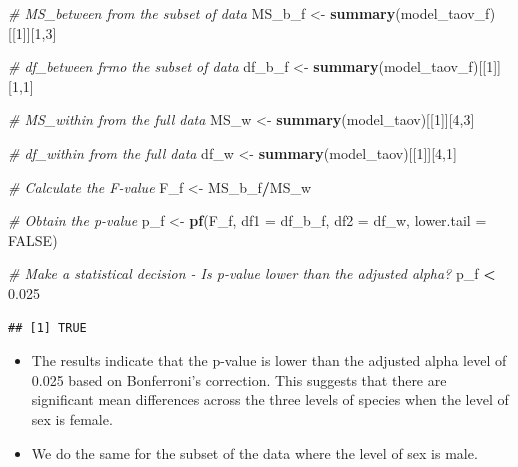 \documentclass[
]{book}
\newenvironment{Shaded}{\begin{snugshade}}{\end{snugshade}}
\newcommand{\AttributeTok}[1]{\textcolor[rgb]{0.13,0.29,0.53}{#1}}
\newcommand{\CommentTok}[1]{\textcolor[rgb]{0.56,0.35,0.01}{\textit{#1}}}
\newcommand{\ConstantTok}[1]{\textcolor[rgb]{0.56,0.35,0.01}{#1}}
\newcommand{\DecValTok}[1]{\textcolor[rgb]{0.00,0.00,0.81}{#1}}
\newcommand{\FloatTok}[1]{\textcolor[rgb]{0.00,0.00,0.81}{#1}}
\newcommand{\FunctionTok}[1]{\textcolor[rgb]{0.13,0.29,0.53}{\textbf{#1}}}
\newcommand{\NormalTok}[1]{#1}
\newcommand{\OtherTok}[1]{\textcolor[rgb]{0.56,0.35,0.01}{#1}}
\newcommand{\SpecialCharTok}[1]{\textcolor[rgb]{0.81,0.36,0.00}{\textbf{#1}}}
\begin{document}
\begin{Shaded}
\begin{Highlighting}[]
\CommentTok{\# MS\_between from the subset of data}
\NormalTok{MS\_b\_f }\OtherTok{\textless{}{-}} \FunctionTok{summary}\NormalTok{(model\_taov\_f)[[}\DecValTok{1}\NormalTok{]][}\DecValTok{1}\NormalTok{,}\DecValTok{3}\NormalTok{]}

\CommentTok{\# df\_between frmo the subset of data}
\NormalTok{df\_b\_f }\OtherTok{\textless{}{-}} \FunctionTok{summary}\NormalTok{(model\_taov\_f)[[}\DecValTok{1}\NormalTok{]][}\DecValTok{1}\NormalTok{,}\DecValTok{1}\NormalTok{]}

\CommentTok{\# MS\_within from the full data}
\NormalTok{MS\_w }\OtherTok{\textless{}{-}} \FunctionTok{summary}\NormalTok{(model\_taov)[[}\DecValTok{1}\NormalTok{]][}\DecValTok{4}\NormalTok{,}\DecValTok{3}\NormalTok{]}

\CommentTok{\# df\_within from the full data}
\NormalTok{df\_w }\OtherTok{\textless{}{-}} \FunctionTok{summary}\NormalTok{(model\_taov)[[}\DecValTok{1}\NormalTok{]][}\DecValTok{4}\NormalTok{,}\DecValTok{1}\NormalTok{]}

\CommentTok{\# Calculate the F{-}value}
\NormalTok{F\_f }\OtherTok{\textless{}{-}}\NormalTok{ MS\_b\_f}\SpecialCharTok{/}\NormalTok{MS\_w}

\CommentTok{\# Obtain the p{-}value}
\NormalTok{p\_f }\OtherTok{\textless{}{-}} \FunctionTok{pf}\NormalTok{(F\_f, }\AttributeTok{df1 =}\NormalTok{ df\_b\_f, }\AttributeTok{df2 =}\NormalTok{ df\_w, }\AttributeTok{lower.tail =} \ConstantTok{FALSE}\NormalTok{)}

\CommentTok{\# Make a statistical decision {-} Is p{-}value lower than the adjusted alpha?}
\NormalTok{p\_f }\SpecialCharTok{\textless{}} \FloatTok{0.025}
\end{Highlighting}
\end{Shaded}

\begin{verbatim}
## [1] TRUE
\end{verbatim}

\begin{itemize}
\item
  The results indicate that the p-value is lower than the adjusted alpha level of 0.025 based on Bonferroni's correction. This suggests that there are significant mean differences across the three levels of species when the level of sex is female.
\item
  We do the same for the subset of the data where the level of sex is male.
\end{itemize}
\end{document}
